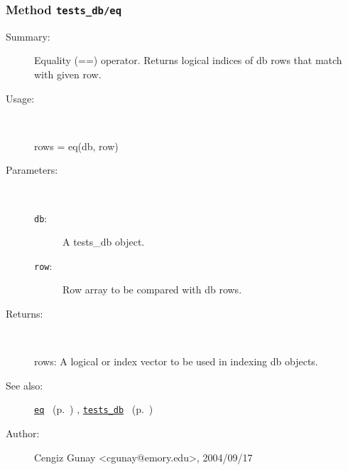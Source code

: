 \subsubsection[Method \texttt{eq}]{Method \texttt{tests\_db/eq}}%
%
\label{ref_tests_db__eq}%
\hypertarget{ref_tests_db__eq}{}%
\begin{description}
\item[Summary:]Equality (==) operator. Returns logical indices of db rows 
	that match with given row.
%
\item[Usage:]~%
\begin{lyxcode}%
rows = eq(db, row)
%
\end{lyxcode}%
%
%
\item[Parameters:]~
\begin{description}%
\item[\texttt{db}:]
 A tests\_db object.
\item[\texttt{row}:]
 Row array to be compared with db rows.
\end{description}%
%
\item[Returns:
]~

	rows: A logical or index vector to be used in indexing db objects. 
%
%
\item[See also:]%
\hyperlink{ref_eq}{\texttt{eq}}%
\ (p.~\pageref{ref_eq})%
%
, \hyperlink{ref_tests_db}{\texttt{tests\_db}}%
\ (p.~\pageref{ref_tests_db})%
%
%
\item[Author:]%
Cengiz Gunay <cgunay@emory.edu>, 2004/09/17
%
\end{description}
\methodline%
